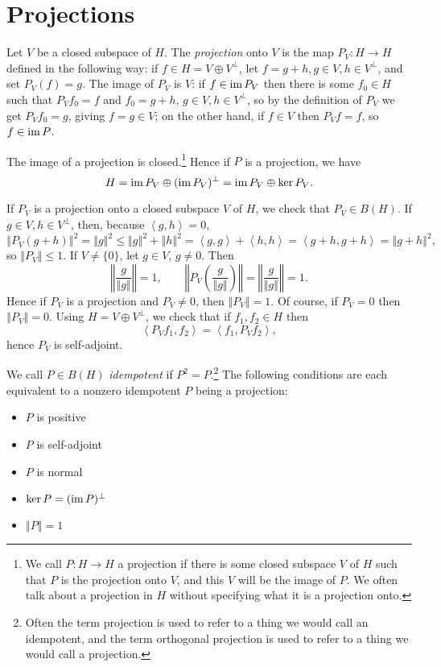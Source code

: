 \documentclass{article}
\newcommand{\inner}[2]{\left\langle #1, #2 \right\rangle}
\newcommand{\im}{\textrm{im\,}}
\newcommand{\norm}[1]{\left\Vert #1 \right\Vert}
\begin{document}
\section{Projections}
Let $V$ be a closed subspace of $H$.
The {\em  projection} onto $V$ is the map $P_V:H \to H$ defined in the following way: if $f \in H=V \oplus V^\perp$, let $f=g+h, g \in V, h \in V^\perp$, and set $P_V(f)=g$. The image of $P_V$ is $V$:
if $f \in \im P_V$ then there is some $f_0 \in H$ such that $P_V f_0 =f$ and $f_0=g+h$, $g \in V, h \in V^\perp$, so by
the definition of $P_V$ we get $P_V f_0=g$, giving $f=g \in V$; on the other hand, if $f \in V$ then $P_V f = f$, so $f \in \im P$.

The image of a projection is closed.\footnote{We call $P:H \to H$ a projection if there is some closed subspace $V$ of $H$ such that $P$ is the projection onto $V$, and this $V$ will be the image of $P$. We often talk about a projection in $H$ without specifying what it is a projection onto.}
Hence if $P$ is a projection, we have
\[
H=\im P_V \oplus (\im P_V)^\perp = \im P_V \oplus \ker P_V.
\]


If $P_V$ is a projection onto a closed subspace $V$ of $H$,
we check that
$P_V \in B(H)$. If $g \in V, h \in V^\perp$, then, because $\inner{g}{h}=0$,
\[
\norm{P_V(g+h)}^2=\norm{g}^2 \leq \norm{g}^2+\norm{h}^2 =\inner{g}{g}+\inner{h}{h}=\inner{g+h}{g+h}=\norm{g+h}^2,
\] 
so $\norm{P_V} \leq 1$. If $V \neq \{0\}$, let $g \in V$, $g \neq 0$. Then
\[
\norm{\frac{g}{\norm{g}}}=1, \qquad \norm{P_V \left( \frac{g}{\norm{g}} \right)}=\norm{\frac{g}{\norm{g}}}=1.
\]
Hence if $P_V$ is a projection and $P_V \neq 0$, then $\norm{P_V}=1$. Of course, if $P_V=0$ then $\norm{P_V}=0$. 
Using $H=V \oplus V^\perp$, we check that
if  $f_1,f_2 \in H$ then
\[
\inner{P_V f_1}{f_2}=\inner{f_1}{P_V f_2},
\]
hence  $P_V$ is self-adjoint.


We call $P \in B(H)$  {\em idempotent} if $P^2=P$.\footnote{Often the term projection is used to refer to a thing we would call an idempotent, and the term orthogonal projection is used to refer to a thing   we would call a projection.} The following conditions are each equivalent to a nonzero idempotent $P$ being a  projection:
\begin{itemize}
\item $P$ is positive
\item $P$ is self-adjoint
\item $P$ is normal
\item $\ker P=(\im P)^\perp$
\item $\norm{P}=1$
\end{itemize}
\end{document}
